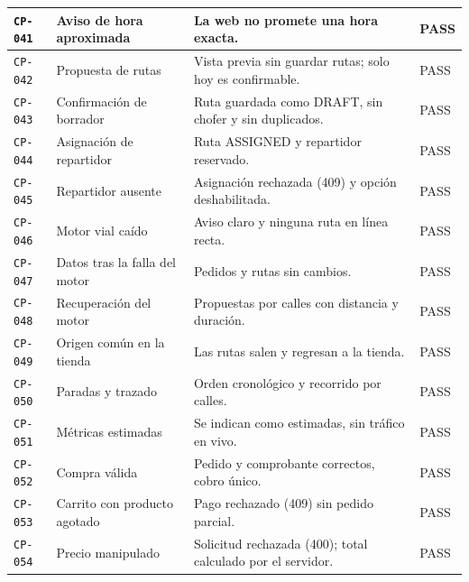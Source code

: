 {\begin{longtable}{|P{1.6cm}|P{4.6cm}|P{7.4cm}|P{1.5cm}|}
\texttt{CP-041} & Aviso de hora aproximada & La web no promete una hora exacta. & PASS \\ \hline
\texttt{CP-042} & Propuesta de rutas & Vista previa sin guardar rutas; solo hoy es confirmable. & PASS \\ \hline
\texttt{CP-043} & Confirmación de borrador & Ruta guardada como DRAFT, sin chofer y sin duplicados. & PASS \\ \hline
\texttt{CP-044} & Asignación de repartidor & Ruta ASSIGNED y repartidor reservado. & PASS \\ \hline
\texttt{CP-045} & Repartidor ausente & Asignación rechazada (409) y opción deshabilitada. & PASS \\ \hline
\texttt{CP-046} & Motor vial caído & Aviso claro y ninguna ruta en línea recta. & PASS \\ \hline
\texttt{CP-047} & Datos tras la falla del motor & Pedidos y rutas sin cambios. & PASS \\ \hline
\texttt{CP-048} & Recuperación del motor & Propuestas por calles con distancia y duración. & PASS \\ \hline
\texttt{CP-049} & Origen común en la tienda & Las rutas salen y regresan a la tienda. & PASS \\ \hline
\texttt{CP-050} & Paradas y trazado & Orden cronológico y recorrido por calles. & PASS \\ \hline
\texttt{CP-051} & Métricas estimadas & Se indican como estimadas, sin tráfico en vivo. & PASS \\ \hline
\texttt{CP-052} & Compra válida & Pedido y comprobante correctos, cobro único. & PASS \\ \hline
\texttt{CP-053} & Carrito con producto agotado & Pago rechazado (409) sin pedido parcial. & PASS \\ \hline
\texttt{CP-054} & Precio manipulado & Solicitud rechazada (400); total calculado por el servidor. & PASS \\ \hline
\end{longtable}
}
